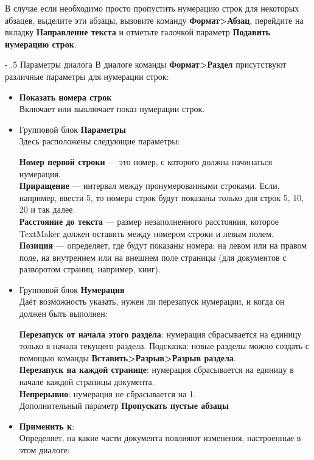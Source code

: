 ﻿\documentclass[a4paper,10pt]{article}
\makeatletter
\renewcommand\paragraph{%
   \@startsection{paragraph}{4}{0mm}%
      {-\baselineskip}%
      {.5\baselineskip}%
      {\normalfont\normalsize\bfseries}}
\makeatother
\begin{document}
В случае если необходимо просто пропустить нумерацию строк для некоторых абзацев, выделите эти абзацы, вызовите команду \textbf{Формат>Абзац}, перейдите на вкладку \textbf{Направление текста} и отметьте галочкой параметр \textbf{Подавить нумерацию строк}.

\paragraph{Параметры диалога}
В диалоге команды \textbf{Формат>Раздел} присутствуют различные параметры для нумерации строк:
\begin{itemize}
 \item \textbf{Показать номера строк}\\
 Включает или выключает показ нумерации строк.
 \item Групповой блок \textbf{Параметры}\\
 Здесь расположены следующие параметры:
 
 \textbf{Номер первой строки} — это номер, с которого должна начинаться нумерация.\\
 \textbf{Приращение} — интервал между пронумерованными строками. Если, например, ввести 5, то номера строк будут показаны только для строк 5, 10, 20 и так далее.\\
 \textbf{Расстояние до текста} — размер незаполненного расстояния, которое TextMaker должен оставить между номером строки и левым полем.\\
 \textbf{Позиция} — определяет, где будут показаны номера: на левом или на правом поле, на внутреннем или на внешнем поле страницы (для документов с разворотом страниц, например, книг).
 \item Групповой блок \textbf{Нумерация}\\
 Даёт возможность указать, нужен ли перезапуск нумерации, и когда он должен быть выполнен:
 
 \textbf{Перезапуск от начала этого раздела}: нумерация сбрасывается на единицу только в начала текущего раздела. Подсказка: новые разделы можно создать с помощью команды \textbf{Вставить>Разрыв>Разрыв раздела}.\\
 \textbf{Перезапуск на каждой странице}: нумерация сбрасывается на единицу в начале каждой страницы документа.\\
 \textbf{Непрерывно}: нумерация не сбрасывается на 1.\\
 Дополнительный параметр \textbf{Пропускать пустые абзацы}
 \item \textbf{Применить к}:\\
 Определяет, на какие части документа повлияют изменения, настроенные в этом диалоге:
 

\end{itemize}
\end{document}
